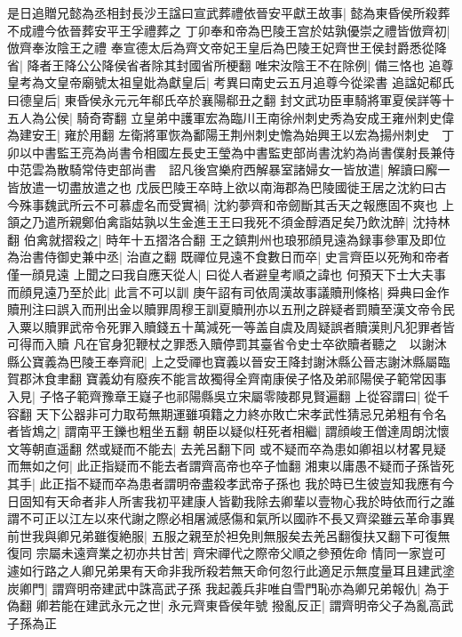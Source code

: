 是日追贈兄懿為丞相封長沙王諡曰宣武葬禮依晉安平獻王故事|{
	懿為東昏侯所殺葬不成禮今依晉葬安平王孚禮葬之}
丁卯奉和帝為巴陵王宫於姑孰優崇之禮皆倣齊初|{
	倣齊奉汝陰王之禮}
奉宣德太后為齊文帝妃王皇后為巴陵王妃齊世王侯封爵悉從降省|{
	降者王降公公降侯省者除其封國省所梗翻}
唯宋汝陰王不在除例|{
	備三恪也}
追尊皇考為文皇帝廟號太祖皇妣為獻皇后|{
	考異曰南史云五月追尊今從梁書}
追諡妃郗氏曰德皇后|{
	東昏侯永元元年郗氏卒於襄陽郗丑之翻}
封文武功臣車騎將軍夏侯詳等十五人為公侯|{
	騎奇寄翻}
立皇弟中護軍宏為臨川王南徐州刺史秀為安成王雍州刺史偉為建安王|{
	雍於用翻}
左衛將軍恢為鄱陽王荆州刺史憺為始興王以宏為揚州刺史　丁卯以中書監王亮為尚書令相國左長史王瑩為中書監吏部尚書沈約為尚書僕射長兼侍中范雲為散騎常侍吏部尚書　詔凡後宫樂府西解暴室諸婦女一皆放遣|{
	解讀曰廨一皆放遣一切盡放遣之也}
戊辰巴陵王卒時上欲以南海郡為巴陵國徙王居之沈約曰古今殊事魏武所云不可慕虚名而受實禍|{
	沈約夢齊和帝劒斷其舌天之報應固不爽也}
上頷之乃遣所親鄭伯禽詣姑孰以生金進王王曰我死不須金醇酒足矣乃飲沈醉|{
	沈持林翻}
伯禽就摺殺之|{
	時年十五摺洛合翻}
王之鎮荆州也琅邪顔見遠為録事參軍及即位為治書侍御史兼中丞|{
	治直之翻}
既禪位見遠不食數日而卒|{
	史言齊臣以死殉和帝者僅一顔見遠}
上聞之曰我自應天從人|{
	曰從人者避皇考順之諱也}
何預天下士大夫事而顔見遠乃至於此|{
	此言不可以訓}
庚午詔有司依周漢故事議贖刑條格|{
	舜典曰金作贖刑注曰誤入而刑出金以贖罪周穆王訓夏贖刑亦以五刑之辟疑者罰贖至漢文帝令民入粟以贖罪武帝令死罪入贖錢五十萬減死一等盖自虞及周疑誤者贖漢則凡犯罪者皆可得而入贖}
凡在官身犯鞭杖之罪悉入贖停罰其臺省令史士卒欲贖者聽之　以謝沐縣公寶義為巴陵王奉齊祀|{
	上之受禪也寶義以晉安王降封謝沐縣公晉志謝沐縣屬臨賀郡沐食聿翻}
寶義幼有廢疾不能言故獨得全齊南康侯子恪及弟祁陽侯子範常因事入見|{
	子恪子範齊豫章王嶷子也祁陽縣吳立宋屬零陵郡見賢遍翻}
上從容謂曰|{
	從千容翻}
天下公器非可力取苟無期運雖項籍之力終亦敗亡宋孝武性猜忌兄弟粗有令名者皆鴆之|{
	謂南平王鑠也粗坐五翻}
朝臣以疑似枉死者相繼|{
	謂顔峻王僧達周朗沈懷文等朝直遥翻}
然或疑而不能去|{
	去羌呂翻下同}
或不疑而卒為患如卿祖以材畧見疑而無如之何|{
	此正指疑而不能去者謂齊高帝也卒子恤翻}
湘東以庸愚不疑而子孫皆死其手|{
	此正指不疑而卒為患者謂明帝盡殺孝武帝子孫也}
我於時已生彼豈知我應有今日固知有天命者非人所害我初平建康人皆勸我除去卿輩以壹物心我於時依而行之誰謂不可正以江左以來代謝之際必相屠滅感傷和氣所以國祚不長又齊梁雖云革命事異前世我與卿兄弟雖復絶服|{
	五服之親至於袒免則無服矣去羌呂翻復扶又翻下可復無復同}
宗屬未遠齊業之初亦共甘苦|{
	齊宋禪代之際帝父順之參預佐命}
情同一家豈可遽如行路之人卿兄弟果有天命非我所殺若無天命何忽行此適足示無度量耳且建武塗炭卿門|{
	謂齊明帝建武中誅高武子孫}
我起義兵非唯自雪門恥亦為卿兄弟報仇|{
	為于偽翻}
卿若能在建武永元之世|{
	永元齊東昏侯年號}
撥亂反正|{
	謂齊明帝父子為亂高武子孫為正}
